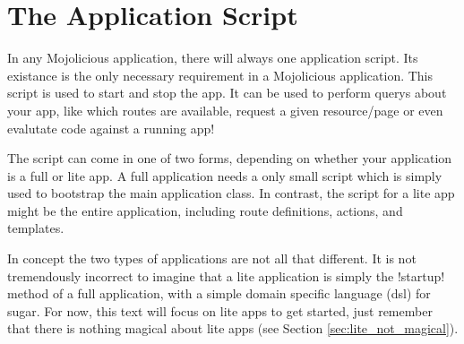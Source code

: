 \section{The Application Script}

In any Mojolicious application, there will always one application script.
Its existance is the only necessary requirement in a Mojolicious application.
This script is used to start and stop the app.
It can be used to perform querys about your app, like which routes are available, request a given resource/page or even evalutate code against a running app!

The script can come in one of two forms, depending on whether your application is a full or lite app.
A full application needs a only small script which is simply used to bootstrap the main application class.
In contrast, the script for a lite app might be the entire application, including route definitions, actions, and templates.

In concept the two types of applications are not all that different.
It is not tremendously incorrect to imagine that a lite application is simply the \lstperl!startup! method of a full application, with a simple domain specific language (dsl) for sugar.
For now, this text will focus on lite apps to get started, just remember that there is nothing magical about lite apps (see Section \ref{sec:lite_not_magical}).
